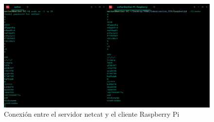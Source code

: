    \begin{figure}[H]
    \centering
    \includegraphics[scale = 0.3]{anexo_b/figuras_dir/sernet.jpg}
    \caption{Conexión entre el servidor netcat y el cliente Raspberry Pi}
    \label{fig:sernet}
    \end{figure}








